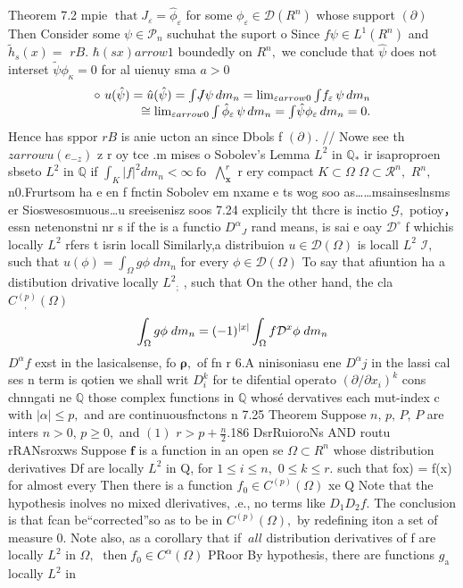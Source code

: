 Theorem 7.2 mpie $\operatorname{that}J_{\varepsilon}={\hat{\phi}}_{\varepsilon}$ for some $\phi_{\varepsilon}\in{\mathcal{D}}(R^{n})$ whose support $(\partial)$ Then Consider some $\psi\in{\mathcal{P}}_{n}$ suchuhat the suport o Since $f\psi\in L^{1}(R^{n})$ and ${\tilde{h}}_{s}(x)=$ $r B.$ $\hbar(s x) arrow1$ boundedly on $\textstyle R^{n},$ we conclude that $\hat{\mathcal{\psi}}$ does not interset ${\tilde{\psi}}\phi_{\kappa}=0$ for al uienuy sma $\scriptstyle{a>0}$ $$ \begin{array}{r l}{\circ\ u(\hat{\psi})=\hat{u}(\hat{\psi})=\int\!J\!\!\!/\psi\,d m_{n}=\operatorname*{lim}_{\varepsilon arrow0}\int\!f_{\varepsilon}\,\psi\,d m_{n}}\\ {\cong\operatorname*{lim}_{\varepsilon arrow0}\int\hat{\phi}_{\varepsilon}\,\psi\,d m_{n}=\int\!\hat{\psi}\phi_{\varepsilon}\,d m_{n}=0.}\end{array} $$ Hence has sppor $r B$ is anie ucton an since Dbols f $(\partial).$ // Nowe see th $z arrow u(e_{-z})$ z r oy tce .m mises o Sobolev's Lemma $L^{2}$ in $\mathbb{Q}_{*}$ ir isaproproen sbseto $L^{2}$ in $\mathbb{Q}$ if $\textstyle\int_{K}\left|f\right|^{2}d m_{n}<\infty{\mathrm{~fo~}}$ $\bigwedge_{\mathbf{x}}^{r}$ r ery compact $K\subset\Omega$ $\Omega\subset{\mathcal{R}}^{n},$ $\textstyle R^{n}\!,$ n0.Frurtsom ha e en f fnctin Sobolev em nxame e ts wog soo as……msainseslnsms er Sioswesosmuous…u sreeisenisz soos 7.24 explicily tht thcre is inctio ${\mathcal{G}},$ potioy，essn netenonstni nr s if the is a functio $D^{\alpha}\!_{J}$ rand means, is sai e oay ${\mathcal{D}}^{\circ}$ f whichis locally $L^{2}$ rfers t isrin locall Similarly,a distribuion $u\in{\mathcal{D}}\left(\Omega\right)$ is locall ${\mathit{L}}^{2}$ ${\mathcal{I}},$ such that $u(\phi)=\textstyle\int_{\Omega}g\phi\;d m_{n}$ for every $\phi\in{\mathcal{D}}(\Omega)$ To say that afiuntion ha a distibution drivative locally $L^{2}{}_{\!;}$ , such that On the other hand, the cla $C_{\,\,\,\,\,,\,\,\,}^{(p)}(\Omega)$ $$ \int_{\Omega}g\phi\;d m_{n}=(-1)^{|x|}\int_{\Omega}f{\cal D}^{x}\phi\;d m_{n} $$ $D^{\alpha}f$ exst in the lasicalsense, fo ${\boldsymbol{\rho}},$ of fn r 6.A ninisoniasu ene $D^{\alpha}j$ in the lassi cal ses n term is qotien we shall writ $D_{i}^{k}$ for te difential operato $(\partial/\partial x_{i})^{k}$ cons chnngati ne $\mathbb{Q}$ those complex functions in $\mathbb{Q}$ whosé dervatives each mut-index c with $|\alpha|\leq p,$ and are continuousfnctons n 7.25 Theorem Suppose $n,\,p,\,P,\,P$ are inters $n>0,\,p\geq0,$ and $\left(1\right)$ $r>p+{\frac{n}{2}}.$186 DsrRuioroNs AND routu rRANsroxws Suppose $\boldsymbol{f}$ is a function in an open se $\Omega\subset R^{n}$ whose distribution derivatives Df are locally $L^{2}$ in Q, for $1\leq i\leq n,$ $0\leq k\leq r.$ such that fox) = f(x) for almost every Then there is a function $f_{0}\in C^{(p)}(\Omega)$ xe Q Note that the hypothesis inolves no mixed dlerivatives, .e., no terms like $D_{1}D_{2}f.$ The conclusion is that fcan be“corrected”so as to be in $C^{(p)}(\Omega),$ by redefining iton a set of measure $0.$ Note also, as a corollary that if $\ a l l$ distribution derivatives of f are locally $L^{2}$ in $\Omega,$ $\operatorname{then}f_{0}\in C^{\alpha}(\Omega)$ PRoor By hypothesis, there are functions $g_{\mathrm{a}}$ locally $L^{2}$ in 